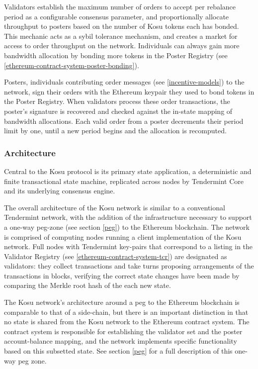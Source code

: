 \documentclass[10pt]{article}
\begin{document}
Validators establish the maximum number of orders to accept per rebalance period as a configurable consensus parameter, and proportionally allocate throughput to posters based on the number of Kosu tokens each has bonded. This mechanic acts as a sybil tolerance mechanism, and creates a market for access to order throughput on the network. Individuals can always gain more bandwidth allocation by bonding more tokens in the Poster Registry (see \ref{ethereum-contract-system-poster-bonding}).
\medskip

Posters, individuals contributing order messages (see \ref{incentive-models}) to the network, sign their orders with the Ethereum keypair they used to bond tokens in the Poster Registry. When validators process these order transactions, the poster’s signature is recovered and checked against the in-state mapping of bandwidth allocations. Each valid order from a poster decrements their period limit by one, until a new period begins and the allocation is recomputed.
\subsubsection{Architecture}\label{tm-network-architecture}
Central to the Kosu protocol is its primary state application, a deterministic and finite transactional state machine, replicated across nodes by Tendermint Core and its underlying consensus engine. 
\medskip

The overall architecture of the Kosu network is similar to a conventional Tendermint network, with the addition of the infrastructure necessary to support a one-way peg-zone (see section \ref{peg}) to the Ethereum blockchain. The network is comprised of computing nodes running a client implementation of the Kosu network. Full nodes with Tendermint key-pairs that correspond to a listing in the Validator Registry (see \ref{ethereum-contract-system-tcr}) are designated as validators: they collect transactions and take turns proposing arrangements of the transactions in blocks, verifying the correct state changes have been made by comparing the Merkle root hash of the each new state. 
\medskip

The Kosu network’s architecture around a peg to the Ethereum blockchain is comparable to that of a side-chain, but there is an important distinction in that no state is shared from the Kosu network to the Ethereum contract system. The contract system is responsible for establishing the validator set and the poster account-balance mapping, and the network implements specific functionality based on this subsetted state. See section \ref{peg} for a full description of this one-way peg zone.
\medskip
\end{document}
